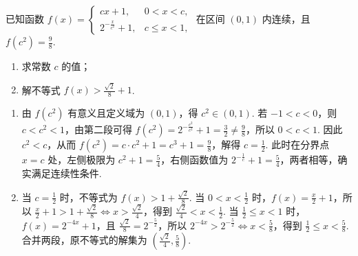 \begin{problem}
已知函数 \( f(x)=\begin{cases}
cx+1,&0<x<c,\\
2^{-\frac{x}{c^{2}}}+1,&c\leqslant x<1,
\end{cases} \) 在区间 \( (0,1) \) 内连续，且 \(f(c^{2})=\frac{9}{8}\).

\begin{enumerate}
\item 求常数 \(c\) 的值；
\item 解不等式 \( f(x) > \frac{\sqrt{2}}{8} + 1 \).
\end{enumerate}

\begin{solution}
\begin{enumerate}
\item 由 \(f(c^2)\) 有意义且定义域为 \((0,1)\)，得 \(c^2\in(0,1)\). 若 \(-1<c<0\)，则 \(c<c^2<1\)，由第二段可得 \(f(c^2)=2^{-\frac{c^2}{c^2}}+1=\frac{3}{2}\ne\frac{9}{8}\)，所以 \(0<c<1\). 因此 \(c^2<c\)，从而 \(f(c^2)=c\cdot c^2+1=c^3+1=\frac{9}{8}\)，解得 \(c=\frac{1}{2}\). 此时在分界点 \(x=c\) 处，左侧极限为 \(c^2+1=\frac{5}{4}\)，右侧函数值为 \(2^{-\frac{1}{c}}+1=\frac{5}{4}\)，两者相等，确实满足连续性条件.

\item 当 \(c=\frac{1}{2}\) 时，不等式为 \(f(x)>1+\frac{\sqrt{2}}{8}\). 当 \(0<x<\frac{1}{2}\) 时，\(f(x)=\frac{x}{2}+1\)，所以 \(\frac{x}{2}+1>1+\frac{\sqrt{2}}{8}\Longleftrightarrow x>\frac{\sqrt{2}}{4}\)，得到 \(\frac{\sqrt{2}}{4}<x<\frac{1}{2}\). 当 \(\frac{1}{2}\leqslant x<1\) 时，\(f(x)=2^{-4x}+1\)，且 \(\frac{\sqrt{2}}{8}=2^{-\frac{5}{2}}\)，所以 \(2^{-4x}>2^{-\frac{5}{2}}\Longleftrightarrow x<\frac{5}{8}\)，得到 \(\frac{1}{2}\leqslant x<\frac{5}{8}\). 合并两段，原不等式的解集为 \(\left(\frac{\sqrt{2}}{4},\frac{5}{8}\right)\).
\end{enumerate}
\end{solution}
\end{problem}

